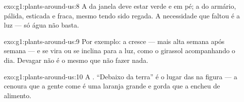 \begin{solution}{exo:g1:plants-around-us:8}
A  da janela deve estar verde e em pé; a do armário, pálida,
esticada e fraca, mesmo tendo sido regada. A necessidade que faltou
é a luz --- só água não basta.
\end{solution}

\begin{solution}{exo:g1:plants-around-us:9}
Por exemplo: a  cresce --- mais alta semana após semana --- e
se vira ou se inclina para a luz, como o girassol acompanhando o
dia. Devagar não é o mesmo que não fazer nada.
\end{solution}

\begin{solution}{exo:g1:plants-around-us:10}
A . ``Debaixo da terra'' é o lugar das  na figura --- a
cenoura que a gente come é uma  laranja grande e gorda que a
 encheu de alimento.
\end{solution}
